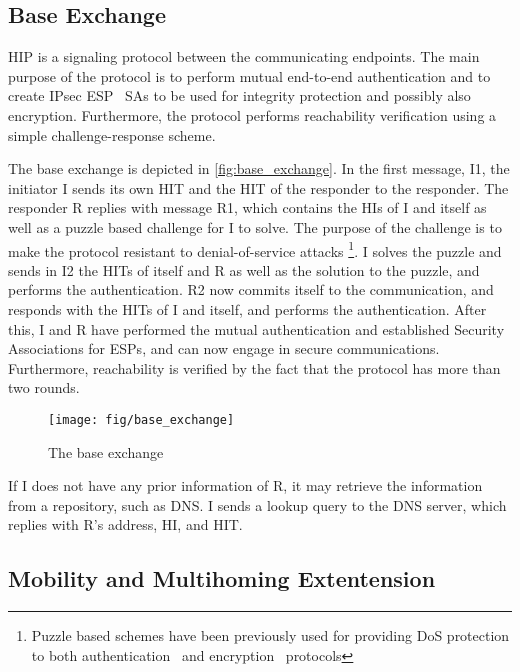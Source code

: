 \subsection{Base Exchange}

\ac{HIP} is a signaling protocol between the communicating
endpoints. The main purpose of the protocol is to perform mutual
end-to-end authentication and to create \ac{IPsec}
\ac{ESP}~\cite{rfc2406} \acp{SA} to be used for integrity protection
and possibly also encryption. Furthermore, the protocol performs
reachability verification using a simple challenge-response scheme.

The base exchange is depicted in \autoref{fig:base_exchange}. In the
first message, I1, the initiator I sends its own \ac{HIT} and the
\ac{HIT} of the responder to the responder. The responder R replies
with message R1, which contains the \acp{HI} of I and itself as well
as a puzzle based challenge for I to solve. The purpose of the
challenge is to make the protocol resistant to denial-of-service
attacks \footnote{Puzzle based schemes have been previously used for
providing \ac{DoS} protection to both
authentication~\cite{clientpuzzle} and encryption~\cite{opportkey}
protocols}. I solves the puzzle and sends in I2 the \acp{HIT} of
itself and R as well as the solution to the puzzle, and performs the
authentication. R2 now commits itself to the communication, and
responds with the \acp{HIT} of I and itself, and performs the
authentication. After this, I and R have performed the mutual
authentication and established Security Associations for \acp{ESP},
and can now engage in secure communications. Furthermore, reachability
is verified by the fact that the protocol has more than two rounds.

\begin{figure}[htt]
\begin{center}
\texttt{[image: fig/base\_exchange]}
\end{center}
\caption{The base exchange}
\label{fig:base_exchange}
\end{figure}

If I does not have any prior information of R, it may retrieve the
information from a repository, such as \ac{DNS}. I sends a lookup
query to the \ac{DNS} server, which replies with R's address, \ac{HI},
and \ac{HIT}.

\subsection{Mobility and Multihoming Extentension}
\label{sec:mm-ext}

